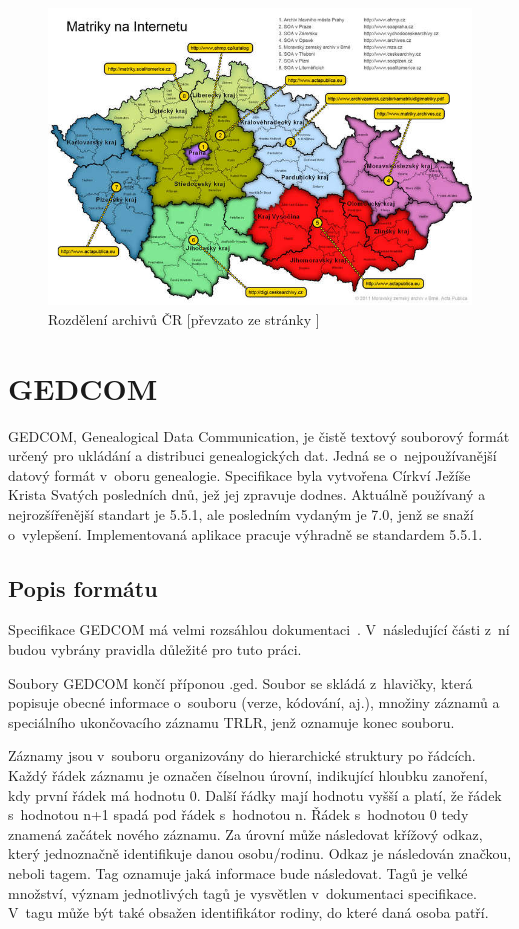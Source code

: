 \begin{figure}[H]
	\centering
	\includegraphics[width=130mm]{obrazky-figures/mapa.jpg}
	\caption[Rozdělení archivů]{Rozdělení archivů ČR [převzato ze stránky \cite{mapa}]}
	\label{figure_archives_map}
\end{figure}

\section{GEDCOM}
GEDCOM, Genealogical Data Communication, je čistě textový souborový formát určený pro ukládání a distribuci genealogických dat. Jedná se o~nejpoužívanější datový formát v~oboru genealogie. Specifikace byla vytvořena Církví Ježíše Krista Svatých posledních dnů, jež jej zpravuje dodnes. Aktuálně používaný a nejrozšířenější standart je 5.5.1, ale posledním vydaným je 7.0, jenž se snaží o~vylepšení. Implementovaná aplikace pracuje výhradně se standardem 5.5.1.

\subsection{Popis formátu}
Specifikace GEDCOM má velmi rozsáhlou dokumentaci~\cite{GEDCOM}. V~následující části z~ní budou vybrány pravidla důležité pro tuto práci.

Soubory GEDCOM končí příponou .ged. Soubor se skládá z~hlavičky, která popisuje obecné informace o~souboru (verze, kódování, aj.), množiny záznamů a speciálního ukončovacího záznamu TRLR, jenž oznamuje konec souboru.

Záznamy jsou v~souboru organizovány do hierarchické struktury po řádcích. Každý řádek záznamu je označen číselnou úrovní, indikující hloubku zanoření, kdy první řádek má hodnotu 0. Další řádky mají hodnotu vyšší a platí, že řádek s~hodnotou n+1 spadá pod řádek s~hodnotou n. Řádek s~hodnotou 0 tedy znamená začátek nového záznamu. Za úrovní může následovat křížový odkaz, který jednoznačně identifikuje danou osobu/rodinu. Odkaz je následován značkou, neboli tagem. Tag oznamuje jaká informace bude následovat. Tagů je velké množství, význam jednotlivých tagů je vysvětlen v~dokumentaci specifikace. V~tagu může být také obsažen identifikátor rodiny, do které daná osoba patří.

